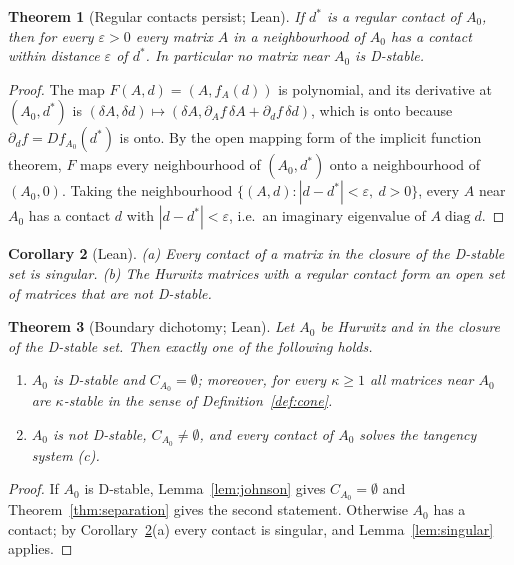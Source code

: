\documentclass[11pt,a4paper]{article}
\theoremstyle{plain}
\newtheorem{theorem}{Theorem}[section]
\newtheorem{corollary}[theorem]{Corollary}
\theoremstyle{definition}
\newcommand{\diag}{\operatorname{diag}}
\begin{document}
\begin{theorem}[Regular contacts persist; Lean]\label{thm:robust}
If $d^{*}$ is a regular contact of $A_0$, then for every $\varepsilon>0$ every matrix $A$ in a neighbourhood of
$A_0$ has a contact within distance $\varepsilon$ of $d^{*}$. In particular no matrix near $A_0$ is D-stable.
\end{theorem}

\begin{proof}
The map $F(A,d)=(A,f_A(d))$ is polynomial, and its derivative at $(A_0,d^{*})$ is
$(\delta A,\delta d)\mapsto(\delta A,\partial_Af\,\delta A+\partial_df\,\delta d)$, which is onto because
$\partial_df=Df_{A_0}(d^{*})$ is onto. By the open mapping form of the implicit function theorem, $F$ maps
every neighbourhood of $(A_0,d^{*})$ onto a neighbourhood of $(A_0,0)$. Taking the neighbourhood
$\{(A,d):|d-d^{*}|<\varepsilon,\ d>0\}$, every $A$ near $A_0$ has a contact $d$ with $|d-d^{*}|<\varepsilon$, i.e.\
an imaginary eigenvalue of $A\diag d$.
\end{proof}

\begin{corollary}[Lean]\label{cor:closure}
(a) Every contact of a matrix in the closure of the D-stable set is singular.
(b) The Hurwitz matrices with a regular contact form an open set of matrices that are not D-stable.
\end{corollary}

\begin{theorem}[Boundary dichotomy; Lean]\label{thm:dichotomy}
Let $A_0$ be Hurwitz and in the closure of the D-stable set. Then exactly one of the following holds.
\begin{enumerate}[label=(\roman*)]
\item $A_0$ is D-stable and $C_{A_0}=\emptyset$; moreover, for every $\kappa\ge1$ all matrices near $A_0$ are
$\kappa$-stable in the sense of Definition~\ref{def:cone}.
\item $A_0$ is not D-stable, $C_{A_0}\neq\emptyset$, and every contact of $A_0$ solves the tangency system (c).
\end{enumerate}
\end{theorem}

\begin{proof}
If $A_0$ is D-stable, Lemma~\ref{lem:johnson} gives $C_{A_0}=\emptyset$ and Theorem~\ref{thm:separation} gives
the second statement. Otherwise $A_0$ has a contact; by Corollary~\ref{cor:closure}(a) every contact is singular,
and Lemma~\ref{lem:singular} applies.
\end{proof}
\end{document}
